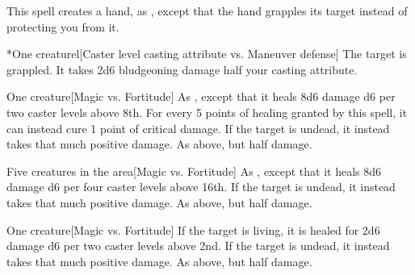 \spellrng{\rngmed}
\spelldur{\durshort \dismissable}
\spellline
\spelleffect This spell creates a hand, as , except that the hand grapples its target instead of protecting you from it.
\begin{spelltarget}*{One creature}l[Caster level \add casting attribute vs. Maneuver defense]
    \spellsuccess The target is grappled. It takes 2d6 bludgeoning damage \add half your casting attribute.
\end{spelltarget}

\spellrng{\rngclose}
\begin{spelltarget}{One creature}[Magic vs. Fortitude]
    \spelleffect As , except that it heals 8d6 damage \add d6 per two caster levels above 8th. For every 5 points of healing granted by this spell, it can instead cure 1 point of critical damage.
    \spellsuccess If the target is undead, it instead takes that much positive damage.
    \spellfailure As above, but half damage.
\end{spelltarget}

\spellrng{\rngclose}
\begin{spelltargets}{Five creatures in the area}[Magic vs. Fortitude]
    \spelleffect As , except that it heals 8d6 damage \add d6 per four caster levels above 16th.
    \spellsuccess If the target is undead, it instead takes that much positive damage.
    \spellfailure As above, but half damage.
\end{spelltargets}

\spellrng{\rngclose}
\begin{spelltarget}{One creature}[Magic vs. Fortitude]
    \spelleffect If the target is living, it is healed for 2d6 damage \add d6 per two caster levels above 2nd.
    \spellsuccess If the target is undead, it instead takes that much positive damage.
    \spellfailure As above, but half damage.
\end{spelltarget}

